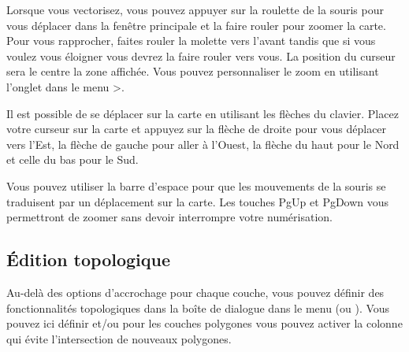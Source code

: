 Lorsque vous vectorisez, vous pouvez appuyer sur la roulette de la souris pour vous déplacer dans la fenêtre principale et la faire rouler pour zoomer la carte. Pour vous rapprocher, faites rouler la molette vers l'avant tandis que si vous voulez vous éloigner vous devrez la faire rouler vers vous. La position du curseur sera le centre la zone affichée. Vous pouvez personnaliser le zoom en utilisant l'onglet  dans le menu  >.



Il est possible de se déplacer sur la carte en utilisant les flèches du clavier. Placez votre curseur sur la carte et appuyez sur la flèche de droite pour vous déplacer vers l'Est, la flèche de gauche pour aller à l'Ouest, la flèche du haut pour le Nord et celle du bas pour le Sud.


Vous pouvez utiliser la barre d'espace pour que les mouvements de la souris se traduisent par un déplacement sur la carte. Les touches PgUp et PgDown vous permettront de zoomer sans devoir interrompre votre numérisation.

\subsection{Édition topologique}

Au-delà des options d'accrochage pour chaque couche, vous pouvez définir des 
fonctionnalités topologiques dans la boîte de dialogue  
dans le menu  (ou ). Vous pouvez ici 
définir  et/ou pour les couches polygones 
vous pouvez activer la colonne   qui évite 
l'intersection de nouveaux polygones.

